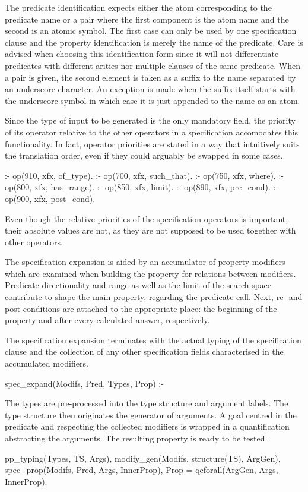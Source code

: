 The predicate identification expects either the atom corresponding to
the predicate name or a pair where the first component is the atom name
and the second is an atomic symbol.
%
The first case can only be used by one specification clause and the
property identification is merely the name of the predicate.
%
Care is advised when choosing this identification form since it will not
differentiate predicates with different arities nor multiple clauses of
the same predicate.
%
When a pair is given, the second element is taken as a suffix to the
name separated by an underscore character.
%
An exception is made when the suffix itself starts with the underscore
symbol in which case it is just appended to the name as an atom.


Since the type of input to be generated is the only mandatory field, the
priority of its operator relative to the other operators in a
specification accomodates this functionality.
%
In fact, operator priorities are stated in a way that intuitively suits the
translation order, even if they could arguably be swapped in some cases.
%
\begin{yapcode}
 :- op(910, xfx, of_type).
 :- op(700, xfx, such_that).
 :- op(750, xfx, where).
 :- op(800, xfx, has_range).
 :- op(850, xfx, limit).
 :- op(890, xfx, pre_cond).
 :- op(900, xfx, post_cond).
\end{yapcode}
%
Even though the relative priorities of the specification operators is
important, their absolute values are not, as they are not supposed to
be used together with other
\Prolog{} operators.


The specification expansion is aided by an accumulator of property
modifiers which are examined when building the property for relations
between modifiers.
%
Predicate directionality and range as well as the limit of the search
space contribute to shape the main property, regarding the predicate
call.
%
Next, re- and post-conditions are attached to the appropriate place: the
beginning of the property and after every calculated answer,
respectively.


The specification expansion terminates with the actual typing of the
specification clause and the collection of any other specification fields
characterised in the accumulated modifiers.
%
\begin{yapcode}
 spec_expand(Modifs, Pred, Types, Prop) :-
\end{yapcode}
%
The types are pre-processed into the type structure and argument labels.
%
The type structure then originates the generator of arguments.
%
A goal centred in the predicate and respecting the collected modifiers
is wrapped in a quantification abstracting the arguments.
%
The resulting property is ready to be tested.
%
\begin{yapcode}
   pp_typing(Types, TS, Args),
   modify_gen(Modifs, structure(TS), ArgGen),
   spec_prop(Modifs, Pred, Args, InnerProp),
   Prop = qcforall(ArgGen, Args, InnerProp).
\end{yapcode}



